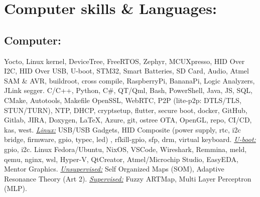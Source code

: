 \documentclass[article]{moderncv}
\begin{document}
\section{Computer skills \& Languages:}
\subsection{Computer:}
%
{Yocto, Linux kernel, DeviceTree, FreeRTOS, Zephyr, MCUXpresso, HID Over I2C, HID Over USB, U-boot, STM32, Smart Batteries, SD Card, Audio, Atmel SAM \& AVR, buildroot, cross compile, RaspberryPi, BananaPi, Logic Analyzers, JLink segger.}{}{}{}
%
{C/C++, Python, C\#, QT/Qml, Bash, PowerShell, Java, JS, SQL, CMake, Autotools, Makefile}{}{}{}
%
{OpenSSL, WebRTC, P2P (lite-p2p: DTLS/TLS, STUN/TURN), NTP, DHCP, cryptsetup, flutter, secure boot, docker, GitHub, Gitlab, JIRA, Doxygen, \LaTeX, Azure, git, ostree OTA, OpenGL, repo, CI/CD, kas, west.}{}{}{}
%
{\underline{\textit{Linux:}} USB/USB Gadgets, HID Composite (power supply, rtc, i2c bridge, firmware, gpio, typec, led) , rfkill-gpio, sfp, drm, virtual keyboard. 
\newline{}\underline{\textit{U-boot:}} gpio, i2c.}{}{}{}
%
{Linux Fedora/Ubuntu, NixOS, VSCode, Wireshark, Remmina, meld, qemu, nginx, wsl, Hyper-V, QtCreator, Atmel/Microchip Studio, EasyEDA, Mentor Graphics.}{}{}{}
%
{\underline{\textit{Unsupervised:}} Self Organized Maps (SOM), Adaptive Resonance Theory (Art 2).  \newline{}\underline{\textit{Supervised:}} Fuzzy ARTMap, Multi Layer Perceptron (MLP).}{}{}{}
\end{document}

